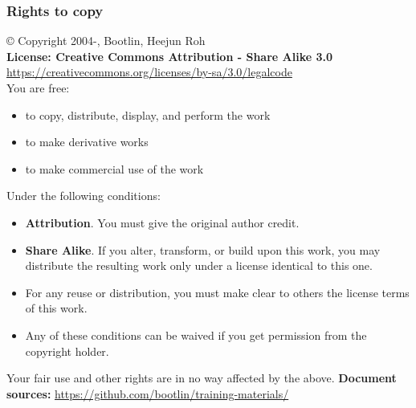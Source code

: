 \begin{frame}
\frametitle{Rights to copy}
   \scriptsize
   © Copyright 2004-\the\year, Bootlin, Heejun Roh \\
   {\bf License: Creative Commons Attribution - Share Alike 3.0} \\
   \url{https://creativecommons.org/licenses/by-sa/3.0/legalcode} \\

   You are free:
   \begin{itemize}
     \item to copy, distribute, display, and perform the work
     \item to make derivative works
     \item to make commercial use of the work
   \end{itemize}

   Under the following conditions:
   \begin{itemize}
     \item {\bf Attribution}. You must give the original author credit.
     \item {\bf Share Alike}. If you alter, transform, or build upon
           this work, you may distribute the resulting work only under
           a license identical to this one.
     \item For any reuse or distribution, you must make clear to others
           the license terms of this work.
     \item Any of these conditions can be waived if you get permission
           from the copyright holder.
    \end{itemize}

    Your fair use and other rights are in no way affected by the above.
    \vfill
    {\bf Document sources:}
    \url{https://github.com/bootlin/training-materials/} \\
\end{frame}

\clearpage
{}%
\renewcommand*{\thepage}{A\arabic{page}}
\appendix
